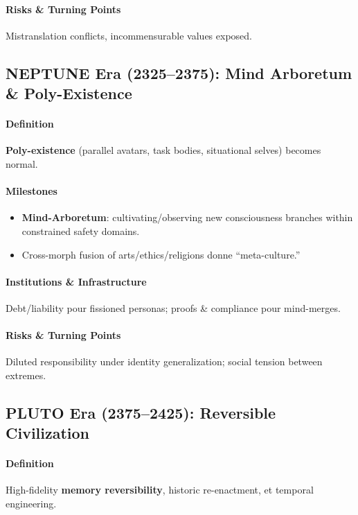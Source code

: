 \documentclass[11pt]{article}
\begin{document}
\paragraph{Risks \& Turning Points} Mistranslation conflicts, incommensurable values exposed.

\subsection{NEPTUNE Era (2325–2375): Mind Arboretum \& Poly-Existence}
\paragraph{Definition} \textbf{Poly-existence} (parallel avatars, task bodies, situational selves) becomes normal.

\paragraph{Milestones}
\begin{itemize}[noitemsep]
  \item \textbf{Mind-Arboretum}: cultivating/observing new consciousness branches within constrained safety domains.
  \item Cross-morph fusion of arts/ethics/religions donne ``meta-culture.''
\end{itemize}

\paragraph{Institutions \& Infrastructure} Debt/liability pour fissioned personas; proofs \& compliance pour mind-merges.

\paragraph{Risks \& Turning Points} Diluted responsibility under identity generalization; social tension between extremes.

\subsection{PLUTO Era (2375–2425): Reversible Civilization}
\paragraph{Definition} High-fidelity \textbf{memory reversibility}, historic re-enactment, et temporal engineering.
\end{document}
